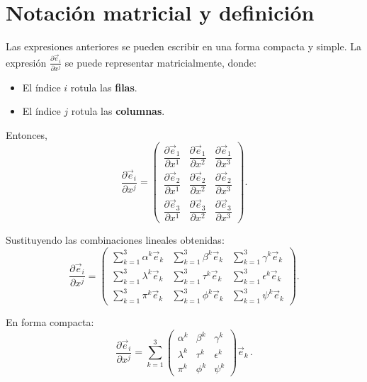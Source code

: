 \documentclass[../apunte_mecanica_clasica.tex]{subfiles}%
\begin{document}
\section{Notación matricial y definición}

Las expresiones anteriores se pueden escribir en una forma 
compacta y simple. La expresión $\frac{\partial \vec{e}_i}{\partial x^j}$   
se puede representar matricialmente, donde:
\begin{itemize}
    \item El índice $i$ rotula las \textbf{filas}.
    \item El índice $j$ rotula las \textbf{columnas}.
\end{itemize}

Entonces,
\begin{equation*}
    \frac{\partial \vec{e}_i}{\partial x^j} =
    \begin{pmatrix}
        \dfrac{\partial \vec{e}_1}{\partial x^1} & \dfrac{\partial \vec{e}_1}{\partial x^2} & \dfrac{\partial \vec{e}_1}{\partial x^3} \\[8pt]
        \dfrac{\partial \vec{e}_2}{\partial x^1} & \dfrac{\partial \vec{e}_2}{\partial x^2} & \dfrac{\partial \vec{e}_2}{\partial x^3} \\[8pt]
        \dfrac{\partial \vec{e}_3}{\partial x^1} & \dfrac{\partial \vec{e}_3}{\partial x^2} & \dfrac{\partial \vec{e}_3}{\partial x^3}
    \end{pmatrix}.
\end{equation*}

Sustituyendo las combinaciones lineales obtenidas:
\begin{equation*}
    \frac{\partial \vec{e}_i}{\partial x^j} =
    \begin{pmatrix}
        \sum_{k=1}^3 \alpha^k \vec{e}_k & \sum_{k=1}^3 \beta^k \vec{e}_k & \sum_{k=1}^3 \gamma^k \vec{e}_k \\[8pt]
        \sum_{k=1}^3 \lambda^k \vec{e}_k & \sum_{k=1}^3 \tau^k \vec{e}_k & \sum_{k=1}^3 \epsilon^k \vec{e}_k \\[8pt]
        \sum_{k=1}^3 \pi^k \vec{e}_k & \sum_{k=1}^3 \phi^k \vec{e}_k & \sum_{k=1}^3 \psi^k \vec{e}_k
    \end{pmatrix}.
\end{equation*}

En forma compacta:
\begin{equation*}
    \frac{\partial \vec{e}_i}{\partial x^j}
    = \sum_{k=1}^3 
    \begin{pmatrix}
        \alpha^k & \beta^k & \gamma^k \\
        \lambda^k & \tau^k & \epsilon^k \\
        \pi^k & \phi^k & \psi^k
    \end{pmatrix} \vec{e}_k \,.
\end{equation*}
\end{document}
